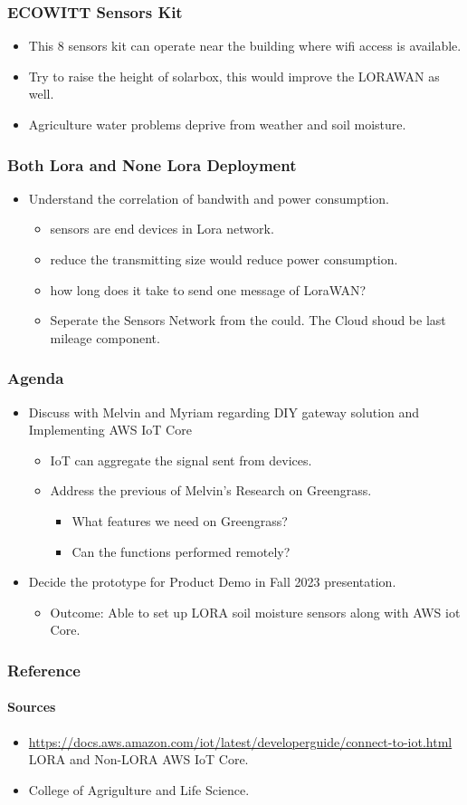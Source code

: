 \documentclass{beamer}
\begin{document}
\begin{frame}
  \frametitle{ECOWITT Sensors Kit}
  \begin{itemize}
    \item This 8 sensors kit can operate near the building where wifi access is available.
    \item Try to raise the height of solarbox, this would improve the LORAWAN as well.  
    \item Agriculture water problems deprive from weather and soil moisture. 
  \end{itemize}
\end{frame}

\begin{frame}
  \frametitle{Both Lora and None Lora Deployment}
  \begin{itemize}
    \item Understand the correlation of bandwith and power consumption.
      \begin{itemize}
        \item sensors are end devices in Lora network.
	\item reduce the transmitting size would reduce power consumption. 
	\item how long does it take to send one message of LoraWAN?
	\item Seperate the Sensors Network from the could. The Cloud shoud be last mileage component.
      \end{itemize}
  \end{itemize}
\end{frame}


\begin{frame}[t]
  \frametitle{Agenda}
 \begin{itemize}
   \item Discuss with Melvin and Myriam regarding DIY gateway solution and Implementing AWS IoT Core
     \begin{itemize}
       \item IoT can aggregate the signal sent from devices. 
       \item Address the previous of Melvin's Research on Greengrass. 
	 \begin{itemize}
	   \item What features we need on Greengrass?
	   \item Can the functions performed remotely?
	 \end{itemize}
     \end{itemize}
   \item Decide the prototype for Product Demo in Fall 2023 presentation.
     \begin{itemize}
       \item Outcome: Able to set up LORA soil moisture sensors along with AWS iot Core.
     \end{itemize}
 \end{itemize} 
\end{frame}


\begin{frame}[t]
  \frametitle{Reference }
  \framesubtitle{Sources}
 \begin{itemize}
    \item \url{https://docs.aws.amazon.com/iot/latest/developerguide/connect-to-iot.html} {LORA and Non-LORA AWS IoT Core}.
    \item College of Agrigulture and Life Science.
  \end{itemize}
  
  
\end{frame}
\end{document}

